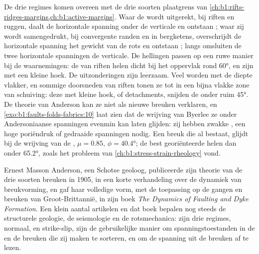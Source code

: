 De drie regimes komen overeen met de drie soorten plaatgrens van \cref{ch:b1:rifts-ridges-margins,ch:b1:active-margins}. Waar de  wordt uitgerekt, bij riften en ruggen, daalt de horizontale spanning onder de verticale en ontstaan ; waar zij wordt samengedrukt, bij convergente randen en in bergketens, overschrijdt de horizontale spanning het gewicht van de rots en ontstaan ; langs  omsluiten de twee horizontale spanningen de verticale. De hellingen passen op een ruwe manier bij de waarnemingen: de  van riften helen dicht bij het oppervlak rond \ang{60}, en  zijn  met een kleine hoek. De uitzonderingen zijn leerzaam. Veel  worden met de diepte vlakker, en sommige doorsneden van riften tonen ze tot in een bijna vlakke zone van schuiving: deze  met kleine hoek, of detachments, snijden de  onder ruim \ang{45}. De theorie van Anderson kan ze niet als nieuwe breuken verklaren, en \cref{exo:b1:faults-folds-fabrics:10} laat zien dat de wrijving van Byerlee ze onder Andersoniaanse spanningen evenmin kan laten glijden: zij hebben zwakke , een hoge poriëndruk of gedraaide spanningen nodig. Een breuk die al bestaat, glijdt bij de wrijving van de , $\mu = 0.85$, $\phi = \ang{40.4}$; de best georiënteerde  helen dan onder \ang{65.2}, zoals het probleem van \cref{ch:b1:stress-strain-rheology} vond.

\begin{history}
Ernest Masson Anderson, een Schotse geoloog, publiceerde zijn theorie van de drie soorten breuken in 1905, in een korte verhandeling over de dynamiek van breukvorming, en gaf haar volledige vorm, met de toepassing op de gangen en breuken van Groot-Brittannië, in zijn boek \emph{The Dynamics of Faulting and Dyke Formation}. Een klein aantal artikelen en dat boek bepalen nog steeds de structurele geologie, de seismologie en de rotsmechanica: zijn drie regimes, normaal,  en strike-slip, zijn de gebruikelijke manier om spanningstoestanden in de  en de breuken die zij maken te sorteren, en om de spanning uit de breuken af te lezen.
\end{history}

